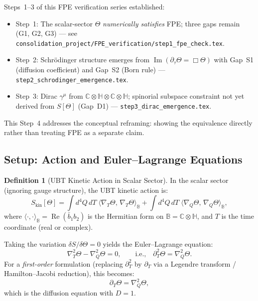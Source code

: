 \documentclass[12pt,a4paper]{article}
\theoremstyle{definition}
\newtheorem{definition}[theorem]{Definition}
\theoremstyle{remark}
\begin{document}
Steps~1--3 of this FPE verification series established:
\begin{itemize}
  \item Step~1: The scalar-sector $\Theta$ \emph{numerically satisfies} FPE;
        three gaps remain (G1, G2, G3) --- see
        \texttt{consolidation\_project/FPE\_verification/step1\_fpe\_check.tex}.
  \item Step~2: Schr\"{o}dinger structure emerges from
        $\operatorname{Im}(\partial_\tau\Theta = \Box\Theta)$ with Gap~S1
        (diffusion coefficient) and Gap~S2 (Born rule) ---
        \texttt{step2\_schrodinger\_emergence.tex}.
  \item Step~3: Dirac $\gamma^\mu$ from $\mathbb{C}\otimes\mathbb{H}\otimes\mathbb{C}\otimes\mathbb{H}$;
        spinorial subspace constraint not yet derived from $S[\Theta]$ (Gap~D1) ---
        \texttt{step3\_dirac\_emergence.tex}.
\end{itemize}

This Step~4 addresses the conceptual reframing: showing the equivalence
directly rather than treating FPE as a separate claim.

\subsection{Setup: Action and Euler--Lagrange Equations}
\label{subsec:setup}

\begin{definition}[UBT Kinetic Action in Scalar Sector]
\label{def:scalar_action}
In the scalar sector (ignoring gauge structure), the UBT kinetic action is:
\begin{equation}
  S_{\mathrm{kin}}[\Theta] = \int d^4Q\,dT\;
    \bigl\langle \nabla_T\Theta,\, \nabla_T\Theta \bigr\rangle_{\mathbb{B}}
  + \int d^4Q\,dT\;
    \bigl\langle \nabla_Q\Theta,\, \nabla_Q\Theta \bigr\rangle_{\mathbb{B}},
\label{eq:scalar_action}
\end{equation}
where $\langle\cdot,\cdot\rangle_{\mathbb{B}} = \operatorname{Re}(\bar{b}_1 b_2)$ is
the Hermitian form on $\mathbb{B} = \mathbb{C}\otimes\mathbb{H}$, and $T$
is the time coordinate (real or complex).
\end{definition}

Taking the variation $\delta S/\delta\Theta = 0$ yields the Euler--Lagrange equation:
\begin{equation}
  \nabla_T^2\Theta - \nabla_Q^2\Theta = 0,
  \qquad \text{i.e.,} \quad
  \partial_T^2\Theta = \nabla_Q^2\Theta.
\label{eq:el_scalar}
\end{equation}
For a \emph{first-order} formulation (replacing $\partial_T^2$ by $\partial_T$
via a Legendre transform / Hamilton--Jacobi reduction), this becomes:
\begin{equation}
  \partial_T\Theta = \nabla_Q^2\Theta,
\label{eq:heat_form}
\end{equation}
which is the diffusion equation with $D = 1$.
\end{document}
